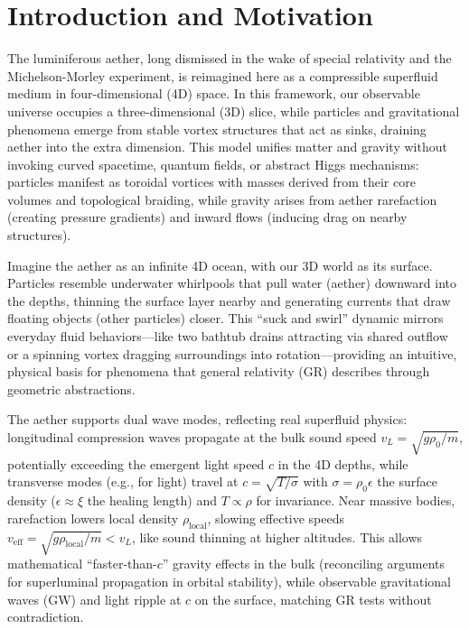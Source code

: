 \documentclass{article}
\begin{document}
\section{Introduction and Motivation}

The luminiferous aether, long dismissed in the wake of special relativity and the Michelson-Morley experiment, is reimagined here as a compressible superfluid medium in four-dimensional (4D) space. In this framework, our observable universe occupies a three-dimensional (3D) slice, while particles and gravitational phenomena emerge from stable vortex structures that act as sinks, draining aether into the extra dimension. This model unifies matter and gravity without invoking curved spacetime, quantum fields, or abstract Higgs mechanisms: particles manifest as toroidal vortices with masses derived from their core volumes and topological braiding, while gravity arises from aether rarefaction (creating pressure gradients) and inward flows (inducing drag on nearby structures).

Imagine the aether as an infinite 4D ocean, with our 3D world as its surface. Particles resemble underwater whirlpools that pull water (aether) downward into the depths, thinning the surface layer nearby and generating currents that draw floating objects (other particles) closer. This ``suck and swirl'' dynamic mirrors everyday fluid behaviors---like two bathtub drains attracting via shared outflow or a spinning vortex dragging surroundings into rotation---providing an intuitive, physical basis for phenomena that general relativity (GR) describes through geometric abstractions.

The aether supports dual wave modes, reflecting real superfluid physics: longitudinal compression waves propagate at the bulk sound speed $v_L = \sqrt{g \rho_0 / m}$, potentially exceeding the emergent light speed $c$ in the 4D depths, while transverse modes (e.g., for light) travel at $c = \sqrt{T / \sigma}$ with $\sigma = \rho_0 \epsilon$ the surface density ($\epsilon \approx \xi$ the healing length) and $T \propto \rho$ for invariance. Near massive bodies, rarefaction lowers local density $\rho_{\text{local}}$, slowing effective speeds $v_{\text{eff}} = \sqrt{g \rho_{\text{local}} / m} < v_L$, like sound thinning at higher altitudes. This allows mathematical ``faster-than-$c$'' gravity effects in the bulk (reconciling arguments for superluminal propagation in orbital stability), while observable gravitational waves (GW) and light ripple at $c$ on the surface, matching GR tests without contradiction.
\end{document}
